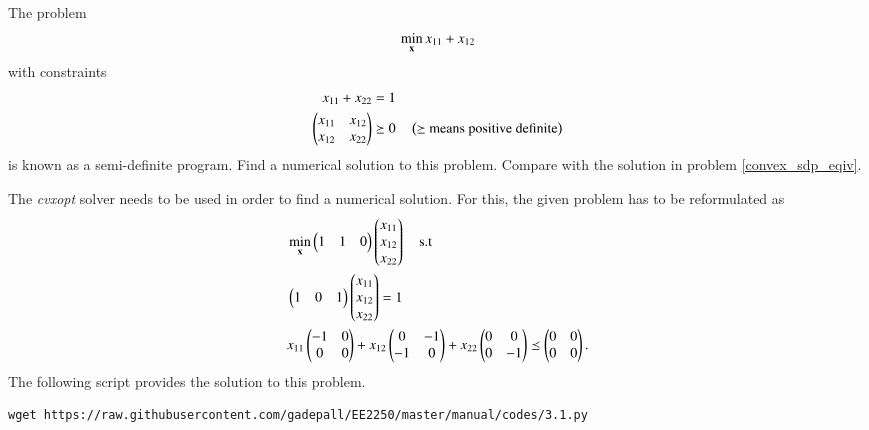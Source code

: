 \documentclass[journal,12pt,twocolumn]{IEEEtran}
\begin{document}
\begin{problem}
%
\label{ch3_convex_ch2}
The problem
\begin{equation}
\min_{\mathbf{x}} x_{11} + x_{12}
\end{equation}
%	
with constraints
\begin{align}
x_{11} + x_{22} &= 1 \\	
\begin{pmatrix}
x_{11} & x_{12} \\
x_{12} & x_{22}
\end{pmatrix} & \succeq 0 \quad  \left(\text{$\succeq$ means positive definite}\right)
\end{align}
%
is known as a semi-definite program.  Find a numerical solution to this problem. Compare with the solution 
in problem  \ref{convex_sdp_eqiv}.
\end{problem}
\solution The {\em cvxopt} solver needs to be used in order to find a numerical solution.  For this, the given problem has to be reformulated as
\begin{align}
&\min_{\mathbf{x}}  
\begin{pmatrix}
1 & 1 & 0
\end{pmatrix}
\begin{pmatrix}
x_{11} 
\\
x_{12}
\\
x_{22}
\end{pmatrix}
\quad \text{s.t}
\\
&
\begin{pmatrix}
1 & 0 & 1
\end{pmatrix}
\begin{pmatrix}
x_{11} 
\\
x_{12}
\\
x_{22}
\end{pmatrix}
=1
\\
&x_{11}
\begin{pmatrix}
-1 & 0 
\\
0 & 0
\end{pmatrix}
+
x_{12}
\begin{pmatrix}
0 & -1
\\
-1 & 0
\end{pmatrix}
+x_{22}
\begin{pmatrix}
0 & 0 
\\
0 & -1
\end{pmatrix}
\preceq 
\begin{pmatrix}
0 & 0 
\\
0 & 0
\end{pmatrix}.
\end{align}
%
The following script provides the solution to this problem.
\begin{lstlisting}
wget https://raw.githubusercontent.com/gadepall/EE2250/master/manual/codes/3.1.py
\end{lstlisting}
\end{document}
